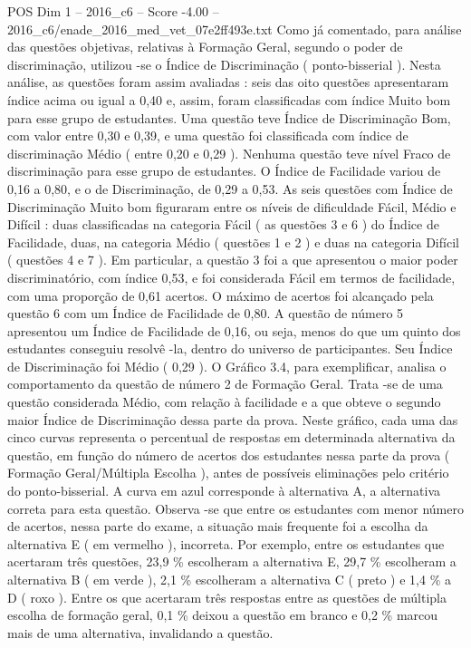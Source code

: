 \begin{textsample}{POS Dim 1 – 2016\_c6 – Score -4.00 – 2016\_c6/enade\_2016\_med\_vet\_07e2ff493e.txt}
Como já comentado, para análise das questões objetivas, relativas à Formação Geral, segundo o poder de discriminação, utilizou -se o Índice de Discriminação ( ponto-bisserial ).
Nesta análise, as questões foram assim avaliadas : seis das oito questões apresentaram índice acima ou igual a 0,40 e, assim, foram classificadas com índice Muito bom para esse grupo de estudantes.
Uma questão teve Índice de Discriminação Bom, com valor entre 0,30 e 0,39, e uma questão foi classificada com índice de discriminação Médio ( entre 0,20 e 0,29 ).
Nenhuma questão teve nível Fraco de discriminação para esse grupo de estudantes.
O Índice de Facilidade variou de 0,16 a 0,80, e o de Discriminação, de 0,29 a 0,53.
As seis questões com Índice de Discriminação Muito bom figuraram entre os níveis de dificuldade Fácil, Médio e Difícil : duas classificadas na categoria Fácil ( as questões 3 e 6 ) do Índice de Facilidade, duas, na categoria Médio ( questões 1 e 2 ) e duas na categoria Difícil ( questões 4 e 7 ).
Em particular, a questão 3 foi a que apresentou o maior poder discriminatório, com índice 0,53, e foi considerada Fácil em termos de facilidade, com uma proporção de 0,61 acertos.
O máximo de acertos foi alcançado pela questão 6 com um Índice de Facilidade de 0,80.
A questão de número 5 apresentou um Índice de Facilidade de 0,16, ou seja, menos do que um quinto dos estudantes conseguiu resolvê -la, dentro do universo de participantes.
Seu Índice de Discriminação foi Médio ( 0,29 ).
O Gráfico 3.4, para exemplificar, analisa o comportamento da questão de número 2 de Formação Geral.
Trata -se de uma questão considerada Médio, com relação à facilidade e a que obteve o segundo maior Índice de Discriminação dessa parte da prova.
Neste gráfico, cada uma das cinco curvas representa o percentual de respostas em determinada alternativa da questão, em função do número de acertos dos estudantes nessa parte da prova ( Formação Geral/Múltipla Escolha ), antes de possíveis eliminações pelo critério do ponto-bisserial.
A curva em azul corresponde à alternativa A, a alternativa correta para esta questão.
Observa -se que entre os estudantes com menor número de acertos, nessa parte do exame, a situação mais frequente foi a escolha da alternativa E ( em vermelho ), incorreta.
Por exemplo, entre os estudantes que acertaram três questões, 23,9 \% escolheram a alternativa E, 29,7 \% escolheram a alternativa B ( em verde ), 2,1 \% escolheram a alternativa C ( preto ) e 1,4 \% a D ( roxo ).
Entre os que acertaram três respostas entre as questões de múltipla escolha de formação geral, 0,1 \% deixou a questão em branco e 0,2 \% marcou mais de uma alternativa, invalidando a questão.

\end{textsample}
